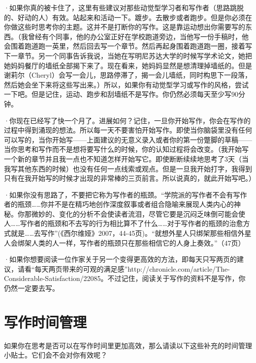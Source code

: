 \documentclass{ctexart}
\begin{document}
·如果你真的被卡住了，这里有些建议对那些动觉型学习者和写作者（思路跳脱的、好动的人）有效。站起来和活动一下。踱步。去散步或者跑步。但是你必须在你做这些时思考你的主题。这并不是打断你的写作。这是靠运动想出你需要写的东西。（我曾经有个同事，他的办公室正好在学校跑道旁边，当他写一份手稿时，他会围着跑道跑一英里，然后回去写一个章节。然后再起身围着跑道跑一圈，接着写下一章节。另一个同事告诉我说，当她在写明尼苏达大学的时候写学术论文，她把她妈妈餐厅的墙纸全部揭下来了。现在看来，她妈妈显然是想清理掉墙纸的。但是谢莉尔（Cheryl）会写一会儿，思路停滞了，揭一会儿墙纸，同时构思下一段落，然后她会坐下来将这些写出来。）所以，如果你有动觉型学习或写作的风格，尝试一下吧。但是记住，运动、跑步和刮墙纸不是写作。你仍然必须每天至少写90分钟。

·你现在已经写了快一个月了。进展如何？记住，一旦你开始写作，你会在写作的过程中得到涌现的想法。所以每一天不要害怕开始写作。即使当你脑袋里没有任何可以写的，当你开始写——上面建议的无意义录入或者你的第一份蹩脚的草稿——当你思考和写作而不是想将要写什么的时候，你的认知过程将会改变。（我开始写一个新的章节并且我一点也不知道怎样开始写它。即使断断续续地思考了3天（当我写其他东西的时候）也没有任何一点线索或观点。但是一旦我开始打字，我得到只有在我开始写的时候才出现的非常棒的三页前言。所以说真的，就此开始写吧。）

·如果你没有思路了，不要把它称为写作者的瓶颈。“学院派的写作者不会有写作者的瓶颈……你并不是在精巧地创作深度叙事或者组合隐喻来展现人类内心的神秘。你那微妙的、变化的分析不会使读者流泪，尽管它要是沉闷乏味倒可能会使人……写作者的瓶颈和不去写的行为相比算不了什么……对于写作者的瓶颈的治愈方式就是……去写作”(《西尔维娅》2007，44-45页)。“就想外星人只绑架那些相信外星人会绑架人类的人一样，写作者的瓶颈只在那些相信它的人身上奏效。”（47页）

·如果你想要阅读一位作家关于另一个变得更高效的方法，即每天只写两页的建议，请看“每天两页带来的可观的满足感”http://chronicle.com/article/The-Considerable-Satisfaction/22085。不过记住，阅读关于写作的资料不是写作，你仍然一定要去写。

\section{写作时间管理}
如果你在思考是否可以在写作时间里更加高效，那么请读以下这些补充的时间管理小贴士。它们会不会对你有效呢？
\end{document}
